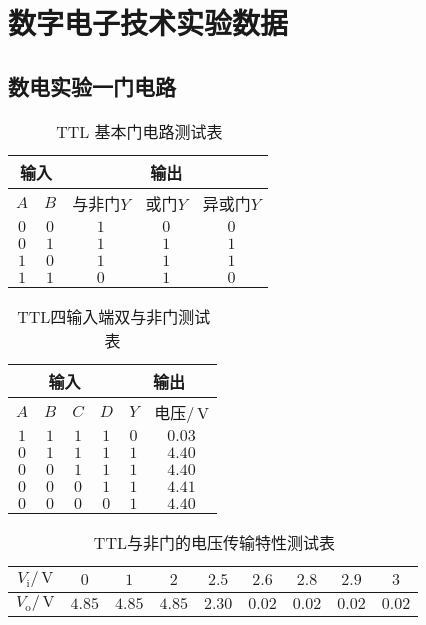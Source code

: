 \documentclass{ctexart}
\renewcommand{\rm}{\,\mathrm}
\begin{document}
    
    
    \newpage
    \section{数字电子技术实验数据}
    \subsection{数电实验一\quad 门电路}
    \begin{table}[h]
    	\centering
    	\caption{$\rm{TTL}$ 基本门电路测试表}
    	\begin{tabular}{|c|c|c|c|c|}
    		\hline
    		\multicolumn{2}{|c}{输入} & \multicolumn{3}{|c|}{输出}\\
    		\hline
    		$A$ & $B$ & 与非门$Y$ & 或门$Y$ & 异或门$Y$\\
    		\hline
    		$0$ & $0$ & $1$ & $0$ & $0$\\
    		\hline
    		$0$ & $1$ & $1$ & $1$ & $1$\\
    		\hline
    		$1$ & $0$ & $1$ & $1$ & $1$\\
    		\hline
    		$1$ & $1$ & $0$ & $1$ & $0$\\
    		\hline
    	\end{tabular}
    \end{table}
    \begin{table}[h]
    	\centering
    	\caption{$\rm{TTL}$四输入端双与非门测试表}
    	\begin{tabular}{|c|c|c|c|c|c|}
    		\hline
    		\multicolumn{4}{|c|}{输入} & \multicolumn{2}{|c|}{输出}\\
    		\hline
    		$A$ & $B$ & $C$ & $D$ & $Y$ & 电压$/\rm{V}$\\
    		\hline
    		$1$ & $1$ & $1$ & $1$ & $0$ & $0.03$\\
    		\hline
    		$0$ & $1$ & $1$ & $1$ & $1$ & $4.40$\\
    		\hline
    		$0$ & $0$ & $1$ & $1$ & $1$ & $4.40$\\
    		\hline
    		$0$ & $0$ & $0$ & $1$ & $1$ & $4.41$\\
    		\hline
    		$0$ & $0$ & $0$ & $0$ & $1$ & $4.40$\\
    		\hline
    	\end{tabular}
    \end{table}
    \begin{table}[h]
    	\centering
    	\caption{$\rm{TTL}$与非门的电压传输特性测试表}
    	\begin{tabular}{|c|c|c|c|c|c|c|c|c|}
    		\hline
    		$V_{\mathrm{i}}/\rm{V}$ & $0$ & $1$ & $2$ & $2.5$ & $2.6$ & $2.8$ & $2.9$ & $3$\\
    		\hline
    		$V_{\mathrm{o}}/\rm{V}$ & $4.85$ & $4.85$ & $4.85$ & $2.30$ & $0.02$ & $0.02$ & $0.02$ & $0.02$\\
    		\hline
    	\end{tabular}
    \end{table}
\end{document}
